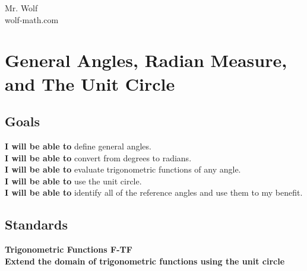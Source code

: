 \documentclass[12pt]{article}
\begin{document}
Mr. Wolf\\
wolf-math.com

\section*{General Angles, Radian Measure, and The Unit Circle}

\subsection*{Goals}

\textbf{I will be able to} define general angles.\\

\textbf{I will be able to} convert from degrees to radians.\\

\textbf{I will be able to} evaluate trigonometric functions of any angle.\\

\textbf{I will be able to} use the unit circle.\\

\textbf{I will be able to} identify all of the reference angles and use them to my benefit.\\



\subsection*{Standards}

\textbf{Trigonometric Functions 	\hfill F-TF}\\

\textbf{Extend the domain of trigonometric functions using the unit circle}\\
\end{document}
